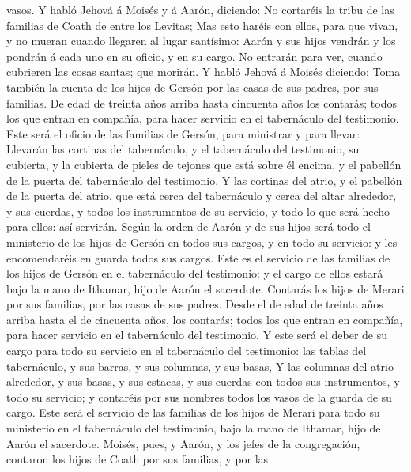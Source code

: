 vasos.  Y habló Jehová á Moisés y á Aarón, diciendo:
 No cortaréis la tribu de las familias de Coath de entre
los Levitas;  Mas esto haréis con ellos, para que vivan, y
no mueran cuando llegaren al lugar santísimo: Aarón y sus hijos vendrán
y los pondrán á cada uno en su oficio, y en su cargo.  No
entrarán para ver, cuando cubrieren las cosas santas; que morirán.
 Y habló Jehová á Moisés diciendo:  Toma
también la cuenta de los hijos de Gersón por las casas de sus padres,
por sus familias.  De edad de treinta años arriba hasta
cincuenta años los contarás; todos los que entran en compañía, para
hacer servicio en el tabernáculo del testimonio.  Este será
el oficio de las familias de Gersón, para ministrar y para llevar:
 Llevarán las cortinas del tabernáculo, y el tabernáculo
del testimonio, su cubierta, y la cubierta de pieles de tejones que está
sobre él encima, y el pabellón de la puerta del tabernáculo del
testimonio,  Y las cortinas del atrio, y el pabellón de la
puerta del atrio, que está cerca del tabernáculo y cerca del altar
alrededor, y sus cuerdas, y todos los instrumentos de su servicio, y
todo lo que será hecho para ellos: así servirán.  Según la
orden de Aarón y de sus hijos será todo el ministerio de los hijos de
Gersón en todos sus cargos, y en todo su servicio: y les encomendaréis
en guarda todos sus cargos.  Este es el servicio de las
familias de los hijos de Gersón en el tabernáculo del testimonio: y el
cargo de ellos estará bajo la mano de Ithamar, hijo de Aarón el
sacerdote.  Contarás los hijos de Merari por sus familias,
por las casas de sus padres.  Desde el de edad de treinta
años arriba hasta el de cincuenta años, los contarás; todos los que
entran en compañía, para hacer servicio en el tabernáculo del
testimonio.  Y este será el deber de su cargo para todo su
servicio en el tabernáculo del testimonio: las tablas del tabernáculo, y
sus barras, y sus columnas, y sus basas,  Y las columnas
del atrio alrededor, y sus basas, y sus estacas, y sus cuerdas con todos
sus instrumentos, y todo su servicio; y contaréis por sus nombres todos
los vasos de la guarda de su cargo.  Este será el servicio
de las familias de los hijos de Merari para todo su ministerio en el
tabernáculo del testimonio, bajo la mano de Ithamar, hijo de Aarón el
sacerdote.  Moisés, pues, y Aarón, y los jefes de la
congregación, contaron los hijos de Coath por sus familias, y por las
